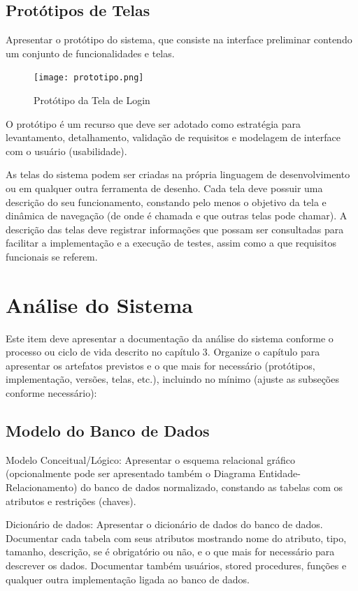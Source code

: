 \documentclass[a4paper,12pt]{article}
\begin{document}
\subsection{Protótipos de Telas}
Apresentar o protótipo do sistema, que consiste na interface preliminar contendo um conjunto de funcionalidades e telas. 

\begin{figure}[h]
    \centering
    \texttt{[image: prototipo.png]}
    \caption{Protótipo da Tela de Login}
    \label{fig:prototipo_login}
\end{figure}

O protótipo é um recurso que deve ser adotado como estratégia para levantamento, detalhamento, validação de requisitos e modelagem de interface com o usuário (usabilidade).

As telas do sistema podem ser criadas na própria linguagem de desenvolvimento ou em qualquer outra ferramenta de desenho. Cada tela deve possuir uma descrição do seu funcionamento, constando pelo menos o objetivo da tela e dinâmica de navegação (de onde é chamada e que outras telas pode chamar). A descrição das telas deve registrar informações que possam ser consultadas para facilitar a implementação e a execução de testes, assim como a que requisitos funcionais se referem.

\newpage
\section{Análise do Sistema}
Este item deve apresentar a documentação da análise do sistema conforme o processo ou ciclo de vida descrito no capítulo 3. Organize o capítulo para apresentar os artefatos previstos e o que mais for necessário (protótipos, implementação, versões, telas, etc.), incluindo no mínimo (ajuste as subseções conforme necessário):

\subsection{Modelo do Banco de Dados}
Modelo Conceitual/Lógico: Apresentar o esquema relacional gráfico (opcionalmente pode ser apresentado também o Diagrama Entidade-Relacionamento) do banco de dados normalizado, constando as tabelas com os atributos e restrições (chaves).

Dicionário de dados: Apresentar o dicionário de dados do banco de dados. Documentar cada tabela com seus atributos mostrando nome do atributo, tipo, tamanho, descrição, se é obrigatório ou não, e o que mais for necessário para descrever os dados. Documentar também usuários, stored procedures, funções e qualquer outra implementação ligada ao banco de dados.
\end{document}
